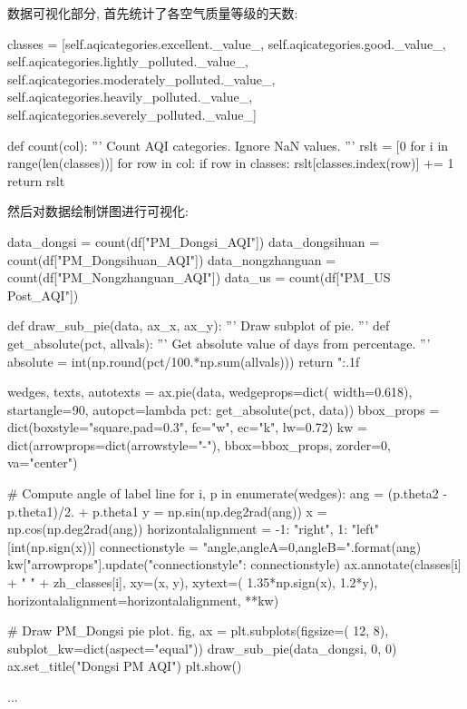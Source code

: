 数据可视化部分, 首先统计了各空气质量等级的天数:
\begin{python}
    classes = [self.aqicategories.excellent._value_,
    self.aqicategories.good._value_,
    self.aqicategories.lightly_polluted._value_,
    self.aqicategories.moderately_polluted._value_,
    self.aqicategories.heavily_polluted._value_,
    self.aqicategories.severely_polluted._value_]

    def count(col):
    '''
    Count AQI categories. Ignore NaN values.
    '''
    rslt = [0 for i in range(len(classes))]
    for row in col:
     if row in classes:
         rslt[classes.index(row)] += 1
    return rslt
\end{python}

然后对数据绘制饼图进行可视化:
\begin{python}
    data_dongsi = count(df["PM_Dongsi_AQI"])
    data_dongsihuan = count(df["PM_Dongsihuan_AQI"])
    data_nongzhanguan = count(df["PM_Nongzhanguan_AQI"])
    data_us = count(df["PM_US Post_AQI"])

    def draw_sub_pie(data, ax_x, ax_y):
    '''
    Draw subplot of pie.
    '''
    def get_absolute(pct, allvals):
        '''
        Get absolute value of days from percentage.
        '''
        absolute = int(np.round(pct/100.*np.sum(allvals)))
        return "{:.1f}%

    wedges, texts, autotexts = ax.pie(data, wedgeprops=dict(
        width=0.618), startangle=90, autopct=lambda pct: get_absolute(pct, data))
    bbox_props = dict(boxstyle="square,pad=0.3",
                      fc="w", ec="k", lw=0.72)
    kw = dict(arrowprops=dict(arrowstyle="-"),
              bbox=bbox_props, zorder=0, va="center")

    # Compute angle of label line
    for i, p in enumerate(wedges):
        ang = (p.theta2 - p.theta1)/2. + p.theta1
        y = np.sin(np.deg2rad(ang))
        x = np.cos(np.deg2rad(ang))
        horizontalalignment = {-1: "right", 1: "left"}[int(np.sign(x))]
        connectionstyle = "angle,angleA=0,angleB={}".format(ang)
        kw["arrowprops"].update({"connectionstyle": connectionstyle})
        ax.annotate(classes[i] + " " + zh_classes[i], xy=(x, y), xytext=(
            1.35*np.sign(x), 1.2*y), horizontalalignment=horizontalalignment, **kw)

    
    # Draw PM_Dongsi pie plot.
    fig, ax = plt.subplots(figsize=(
        12, 8), subplot_kw=dict(aspect="equal"))
    draw_sub_pie(data_dongsi, 0, 0)
    ax.set_title("Dongsi PM AQI")
    plt.show()
    
    ...
\end{python}

